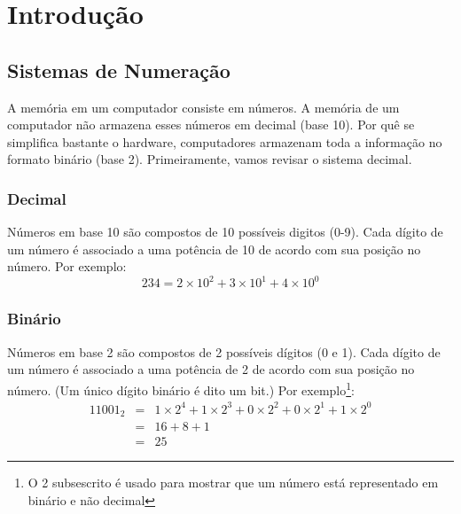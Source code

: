 \chapter{Introdução}
\section{Sistemas de Numeração}

A memória em um computador consiste em números. A memória de um computador não 
armazena esses números em decimal (base 10). Por quê se simplifica bastante o 
hardware, computadores armazenam toda a informação no formato binário (base 2). 
Primeiramente, vamos revisar o sistema decimal.

\subsection{Decimal}

Números em base 10 são compostos de 10 possíveis digitos (0-9). Cada dígito de 
um número é associado a uma potência de 10 de acordo com sua posição no número.
Por exemplo:
\begin{displaymath}
234 = 2 \times 10^2 + 3 \times 10^1 + 4 \times 10^0
\end{displaymath}

\subsection{Binário}

Números em base 2 são compostos de 2 possíveis dígitos (0 e 1). Cada dígito de 
um número é associado a uma potência de 2 de acordo com sua posição no número. 
(Um único dígito binário é dito um bit.) Por exemplo\footnote{O 2 subsescrito 
é usado para mostrar que um número está representado em binário e não decimal}:
\begin{eqnarray*}
11001_2 & = & 1 \times 2^4 + 1 \times 2^3 + 0 \times 2^2 + 0 \times 2^1 
              + 1 \times 2^0 \\
 & = & 16 + 8 + 1 \\
 & = & 25 
\end{eqnarray*}

